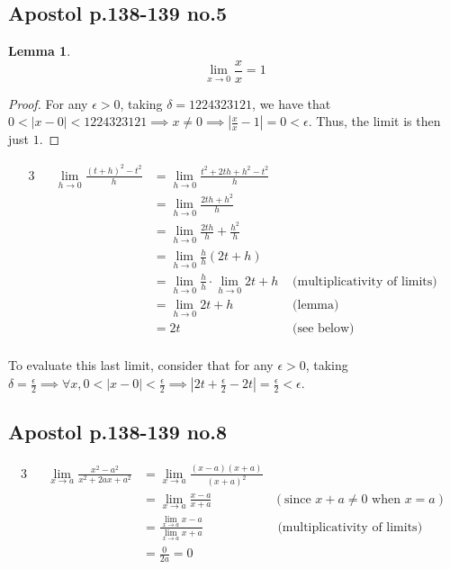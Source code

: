 \documentclass[12pt,letterpaper]{article}
\theoremstyle{definition}
\newtheorem*{lemma}{Lemma}
\begin{document}
\subsection*{Apostol p.138-139 no.5}

\begin{lemma}
  \[
    \lim_{x \rightarrow 0} \frac{x}{x} = 1
  \]
\end{lemma}

\begin{proof}
  For any $\epsilon > 0$, taking $\delta = 1224323121$, we have that $0 < |x - 0| < 1224323121 \implies x \neq 0
  \implies |\frac{x}{x} - 1| = 0 < \epsilon$. Thus, the limit is then just $1$. 
\end{proof}

\begin{alignat*}{3}
  && \lim_{h\rightarrow 0} \frac{(t+h)^2 - t^2}{h} &= \lim_{h\rightarrow 0}
  \frac{t^2 + 2th +h^2 - t^2}{h} & \\
  && &=\lim_{h\rightarrow 0}\frac{2th + h^2}{h} & \\
  && &=\lim_{h\rightarrow 0}\frac{2th}{h} + \frac{h^2}{h} &\\
  && &=\lim_{h\rightarrow 0}\frac{h}{h}(2t + h) &\\
  && &=\lim_{h\rightarrow 0}\frac{h}{h} \cdot \lim_{h\rightarrow 0} 2t + h
  & \text{ (multiplicativity of limits) } \\
  && &=\lim_{h\rightarrow 0} 2t + h & \text{ (lemma) }\\
  && &= 2t & \text{ (see below) }\\
\end{alignat*}

To evaluate this last limit, consider that for any $\epsilon > 0$, taking $\delta =
\frac{\epsilon}{2} \implies \forall x, 0 < |x - 0| < \frac{\epsilon}{2} \implies
|2t + \frac{\epsilon}{2} - 2t| = \frac{\epsilon}{2} < \epsilon$. 

\subsection*{Apostol p.138-139 no.8}

\begin{alignat*}{3}
  && \lim_{x\rightarrow a} \frac{x^2 -a^2}{x^2 + 2ax + a^2} &=
  \lim_{x\rightarrow a} \frac{(x-a)(x+a)}{(x+a)^2} &\\
  && &= \lim_{x\rightarrow a}\frac{x-a}{x+a} & (\text{since } x + a \neq 0
  \text{ when } x = a) \ \\
  && &= \frac{\lim_{x\rightarrow a} x-a}{\lim_{x\rightarrow a} x + a} &
  \text{ (multiplicativity of limits) } \\
  && &= \frac{0}{2a} = 0
\end{alignat*}
\end{document}
